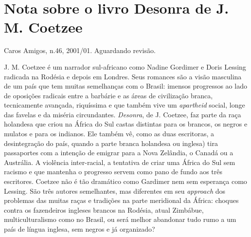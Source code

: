 \documentclass[
  letterpaper,
  DIV=11,
  numbers=noendperiod]{scrreprt}
\begin{document}
\chapter{Nota sobre o livro Desonra de J. M.
Coetzee}\label{nota-sobre-o-livro-desonra-de-j.-m.-coetzee}

Caros Amigos, n.46, 2001/01. Aguardando revisão.

\hfill\break

J. M. Coetzee é um narrador sul-africano como Nadine Gordimer e Doris
Lessing radicada na Rodésia e depois em Londres. Seus romances são a
visão masculina de um país que tem muitas semelhanças com o Brasil:
imensos progressos ao lado de oposições radicais entre a barbárie e as
áreas de civilização branca, tecnicamente avançada, riquíssima e que
também vive um \emph{apartheid} social, longe das favelas e da miséria
circundantes. \emph{Desonra}, de J. Coetzee, faz parte da raça holandesa
que criou na África do Sul castas distintas para os brancos, os negros e
mulatos e para os indianos. Ele também vê, como as duas escritoras, a
desintegração do país, quando a parte branca holandesa ou inglesa) tira
passaportes com a intenção de emigrar para a Nova Zelândia, o Canadá ou
a Austrália. A violência inter-racial, a tentativa de criar uma África
do Sul sem racismo e que mantenha o progresso servem como pano de fundo
aos três escritores. Coetzee não é tão dramático como Gardimer nem sem
esperança como Lessing. São três autores semelhantes, mas diferentes em
seu \emph{approach} dos problemas das muitas raças e tradições na parte
meridional da África: choques contra os fazendeiros ingleses brancos na
Rodésia, atual Zimbábue, multiculturalismo como no Brasil, ou será
melhor abandonar tudo rumo a um país de língua inglesa, sem negros e já
organizado?
\end{document}

